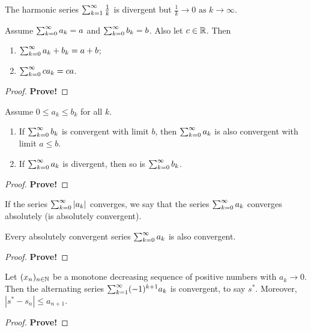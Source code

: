 \documentclass[10pt, a4paper]{article}
\newcommand{\seq}[1][x]{(#1_n)_{n \in \N}}
\newcommand{\limas}[3][n]{#2 \rightarrow #3 \text{ as } #1 \rightarrow \infty}
\begin{document}
\begin{example}
    The harmonic series $\infsum\frac{1}{k}$ is divergent but $\limas[k]{\frac{1}{k}}{0}$.
\end{example}

\begin{theorem}
    Assume $\infsum[k = 0]a_k = a$ and $\infsum[k = 0]b_k = b$.
    Also let $c \in \R$.
    Then
    \begin{enumerate}[label = (\roman*)]
        \item $\infsum[k = 0]{a_k + b_k} = a + b$;
        \item $\infsum[k = 0]{ca_k} = ca$.
    \end{enumerate}
    \begin{proof}
        \textbf{Prove!}
    \end{proof}
\end{theorem}

\begin{theorem}
    Assume $0 \leq a_k \leq b_k$ for all $k$.
    \begin{enumerate}[label = (\roman*)]
        \item If $\infsum[k = 0]b_k$ is convergent with limit $b$,
        then $\infsum[k = 0]a_k$ is also convergent with limit $a \leq b$.
        \item If $\infsum[k = 0]a_k$ is divergent,
        then so is $\infsum[k = 0]b_k$.
    \end{enumerate}
    \begin{proof}
        \textbf{Prove!}
    \end{proof}
\end{theorem}

\begin{definition}
    If the series $\infsum[k = 0]|a_k|$ converges,
    we say that the series $\infsum[k = 0]a_k$ converges absolutely
    (is absolutely convergent).
\end{definition}

\begin{theorem}\label{pre:analy:thm:absconvthmseries}
    Every absolutely convergent series $\infsum[k = 0]a_k$ is also convergent.
    \begin{proof}
        \textbf{Prove!}
    \end{proof}
\end{theorem}

\begin{theorem}
    Let $\seq$ be a monotone decreasing sequence of positive numbers with $a_k \rightarrow 0$.
    Then the alternating series $\infsum(-1) ^ {k + 1}a_k$ is convergent,
    to say $s ^ {*}$.
    Moreover,
    $|s ^ {*} - s_n| \leq a_{n + 1}$.
    \begin{proof}
        \textbf{Prove!}
    \end{proof}
\end{theorem}
\end{document}
